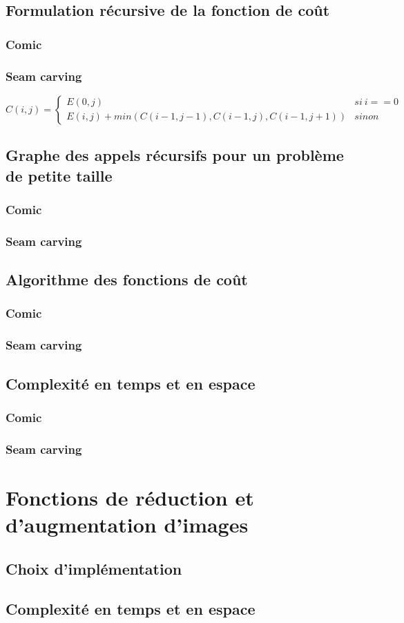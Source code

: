 \documentclass[10pt]{article}
\begin{document}
\subsection{Formulation récursive de la fonction de coût}
\subsubsection{Comic}
\subsubsection{Seam carving}
$$
C(i,j) = \left\{
	\begin{array}{ll}
		E(0,j) & si\ i==0 \\
		E(i,j)+min(C(i-1,j-1),C(i-1,j),C(i-1,j+1)) & sinon
	\end{array}
\right.
$$

\subsection{Graphe des appels récursifs pour un problème de petite taille}
\subsubsection{Comic}
\subsubsection{Seam carving}

\subsection{Algorithme des fonctions de coût}
\subsubsection{Comic}
\subsubsection{Seam carving}

\subsection{Complexité en temps et en espace}
\subsubsection{Comic}
\subsubsection{Seam carving}

\section{Fonctions de réduction et d'augmentation d'images}
\subsection{Choix d'implémentation}
\subsection{Complexité en temps et en espace}
\end{document}
